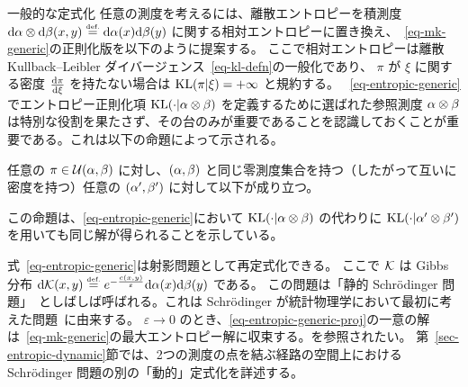 \begin{rem2}{一般的な定式化}
任意の測度を考えるには、離散エントロピーを積測度 $\mathrm{d}\alpha\otimes\mathrm{d}\beta(x,y) \stackrel{\mbox{\upshape\tiny def.}}{=} \mathrm{d}\alpha(x)\mathrm{d}\beta(y)$ に関する相対エントロピーに置き換え、~\eqref{eq-mk-generic}の正則化版を以下のように提案する。
ここで相対エントロピーは離散 Kullback--Leibler ダイバージェンス~\eqref{eq-kl-defn}の一般化であり、
$\pi$ が $\xi$ に関する密度 $\frac{\mathrm{d} \pi}{\mathrm{d}\xi}$ を持たない場合は $\operatorname{KL}(\pi|\xi)=+\infty$ と規約する。
~\eqref{eq-entropic-generic}でエントロピー正則化項 $\operatorname{KL}(\cdot|\alpha\otimes\beta)$ を定義するために選ばれた参照測度 $\alpha\otimes\beta$ は特別な役割を果たさず、その台のみが重要であることを認識しておくことが重要である。これは以下の命題によって示される。

\begin{prop}
	任意の $\pi \in \mathcal{U}(\alpha,\beta)$ に対し、$(\alpha,\beta)$ と同じ零測度集合を持つ（したがって互いに密度を持つ）任意の $(\alpha',\beta')$ に対して以下が成り立つ。
\end{prop}

この命題は、\eqref{eq-entropic-generic}において $\operatorname{KL}(\cdot|\alpha\otimes\beta)$ の代わりに $\operatorname{KL}(\cdot|\alpha'\otimes\beta')$ を用いても同じ解が得られることを示している。


式~\eqref{eq-entropic-generic}は射影問題として再定式化できる。
\eql{\label{eq-entropic-generic-proj}
	\umin{\pi \in \Couplings(\al,\be)} \KL(\pi|\Kk),
}
ここで $\mathcal{K}$ は Gibbs 分布 $\mathrm{d}\mathcal{K}(x,y) \stackrel{\mbox{\upshape\tiny def.}}{=} e^{-\frac{c(x,y)}{\varepsilon}} \mathrm{d}\alpha(x)\mathrm{d}\beta(y)$ である。
この問題は「静的 Schr\"odinger 問題」~\citep{LeonardSchroedinger,RuschendorfThomsen}としばしば呼ばれる。これは Schr\"odinger が統計物理学において最初に考えた問題~\citep{Schroedinger31}に由来する。
$\varepsilon \rightarrow 0$ のとき、\eqref{eq-entropic-generic-proj}の一意の解は~\eqref{eq-mk-generic}の最大エントロピー解に収束する。\citep{leonard2012schrodinger,2017-carlier-SIMA}を参照されたい。
第~\ref{sec-entropic-dynamic}節では、2つの測度の点を結ぶ経路の空間上における Schr\"odinger 問題の別の「動的」定式化を詳述する。
\end{rem2}

